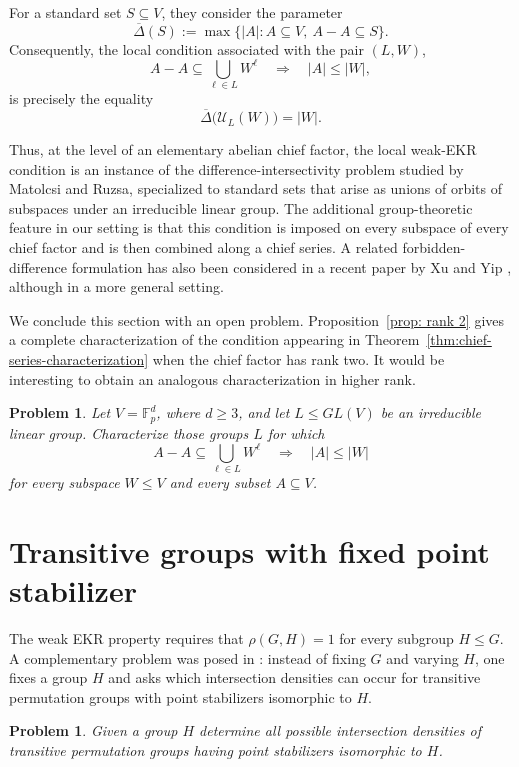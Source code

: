 \documentclass[11pt]{article}
\newtheorem{problem}[theorem]{Problem}
\begin{document}
For a standard set \(S\subseteq V\), they consider the parameter
\[
\overline{\Delta}(S)
 :=
 \max\bigl\{
 |A|:A\subseteq V,\ A-A\subseteq S
 \bigr\}.
\]
Consequently, the local condition associated with the pair
\((L,W)\),
\[
A-A\subseteq\bigcup_{\ell\in L}W^\ell
\quad\Longrightarrow\quad
|A|\leq |W|,
\]
is precisely the equality
\[
\overline{\Delta}\bigl(\mathcal{U}_L(W)\bigr)=|W|.
\]

Thus, at the level of an elementary abelian chief factor, the local
weak-EKR condition is an instance of the difference-intersectivity
problem studied by Matolcsi and Ruzsa, specialized to standard sets
that arise as unions of orbits of subspaces under an irreducible
linear group. The additional group-theoretic feature in our setting
is that this condition is imposed on every subspace of every chief
factor and is then combined along a chief series.
A related forbidden-difference formulation has also been considered
in a recent paper by Xu and Yip \cite{XuYip2026}, although in a more general
setting.



We conclude this section with an open problem. Proposition~\ref{prop: rank 2}
gives a complete characterization of the condition appearing in
Theorem~\ref{thm:chief-series-characterization} when the chief factor has rank two. It would be interesting
to obtain an analogous characterization in higher rank.

\begin{problem}\label{prob:higher-rank}
Let $V=\mathbb{F}_p^d$, where $d\geq 3$, and let
$L\leq GL(V)$ be an irreducible linear group. Characterize those
groups $L$ for which
\[
 A-A\subseteq \bigcup_{\ell\in L}W^\ell
 \quad\Longrightarrow\quad
 |A|\leq |W|
\]
for every subspace $W\leq V$ and every subset $A\subseteq V$.
\end{problem}

\section{Transitive groups with fixed point stabilizer}

The weak EKR property requires that $\rho(G,H)=1$ for every subgroup $H\leq G$. A complementary problem was posed in \cite[Problem 7.4]{HujdurovicKovacsKutnarMarusic2025}: instead of fixing $G$ and varying $H$, one fixes a group $H$ and asks which intersection densities can occur for transitive permutation groups with point stabilizers isomorphic to $H$.

\begin{problem}\cite[Problem 7.4]{HujdurovicKovacsKutnarMarusic2025}
\label{prob:point stabilizer H}
    Given a group $H$ determine all possible intersection densities of transitive permutation
groups having point stabilizers isomorphic to $H$.
\end{problem}
\end{document}
